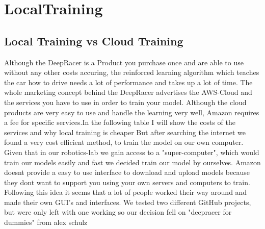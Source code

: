 \chapter{LocalTraining}

\section{Local Training vs Cloud Training}
Although the DeepRacer is a Product you purchase once and are able to use without any other costs accuring, the reinforced learning algorithm which teaches the car how to drive needs a lot of performance and takes up a lot of time. The whole marketing concept behind the DeepRacer advertises the AWS-Cloud and the services you have to use in order to train your model. Although the cloud products are very easy to use and handle the learning very well, Amazon requires a fee for specific services.In the following table I will show the costs of the services and why local training is cheaper
But after searching the internet we found a very cost efficient method, to train the model on our own computer. Given that in our robotics-lab we gain access to a "super-computer", which would train our models easily and fast we decided train our model by ourselves. Amazon doesnt provide a easy to use interface to download and upload models because they dont want to support you using your own servers and computers to train. Following this idea it seems that a lot of people worked their way around and made their own GUI's and interfaces. We tested two different GitHub projects, but were only left with one working so our decision fell on "deepracer for dummies" from alex schulz 

